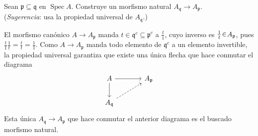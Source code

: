 \begin{ejer}
Sean $\mathfrak{p}\subseteq\mathfrak{q}$ en $\operatorname{Spec}A$. Construye un morfismo natural $A_{\mathfrak{q}}\to A_{\mathfrak{p}}$.\\
(\emph{Sugerencia}: usa la propiedad universal de $A_{\mathfrak{q}}$.)
\end{ejer}
\begin{sol}
El morfismo canónico $A\to A_{\mathfrak{p}}$ manda $t\in\mathfrak{q}^c\subseteq\mathfrak{p}^c$ a $\frac{t}{1}$, cuyo inverso es $\frac{1}{t}\en A_{\mathfrak{p}}$, pues $\frac{t}{1}\frac{1}{t}=\frac{t}{t}=\frac{1}{1}$. Como $A\to A_{\mathfrak{p}}$ manda todo elemento de $\mathfrak{q}^c$ a un elemento invertible, la propiedad universal garantiza que existe una única flecha que hace conmutar el diagrama
\[
\begin{tikzcd}[column sep=large]
A \arrow[r] \arrow[d] & A_{\mathfrak p}\\
A_{\mathfrak q} \arrow[ur,dashed]
\end{tikzcd}
\]
Esta única $A_{\mathfrak{q}}\to A_{\mathfrak{p}}$ que hace conmutar el anterior diagrama es el buscado morfismo natural.
\end{sol}